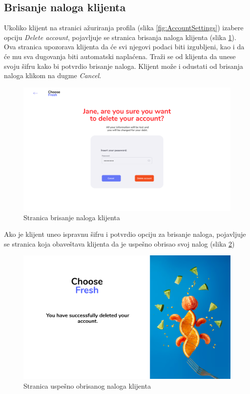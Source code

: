 \subsection{Brisanje naloga klijenta}

Ukoliko klijent na stranici ažuriranja profila (slika \ref{fig:AccountSettings}) izabere opciju \textit{Delete account}, pojavljuje se stranica brisanja naloga klijenta (slika \ref{fig:DeleteAccount}). Ova stranica upozorava klijenta da će svi njegovi podaci biti izgubljeni, kao i da će mu sva dugovanja biti automatski naplaćena. Traži se od klijenta da unese svoju šifru kako bi potvrdio brisanje naloga. Klijent može i odustati od brisanja naloga klikom na dugme \textit{Cancel}.
\begin{figure}[H]
	\begin{center}
		\includegraphics[width=\textwidth]{UI/DeleteAccount.png}
    		\caption{Stranica brisanje naloga klijenta}
    \label{fig:DeleteAccount}
    \end{center}
\end{figure}

Ako je klijent uneo ispravnu šifru i potvrdio opciju za brisanje naloga, pojavljuje se stranica koja obaveštava klijenta da je uspešno obrisao svoj nalog (slika \ref{fig:DeleteAccountSuccessful})

\begin{figure}[H]
	\begin{center}
		\includegraphics[width=\textwidth]{UI/DeleteAccountSuccessful.png}
    		\caption{Stranica uspešno obrisanog naloga klijenta}
    \label{fig:DeleteAccountSuccessful}
    \end{center}
\end{figure}
